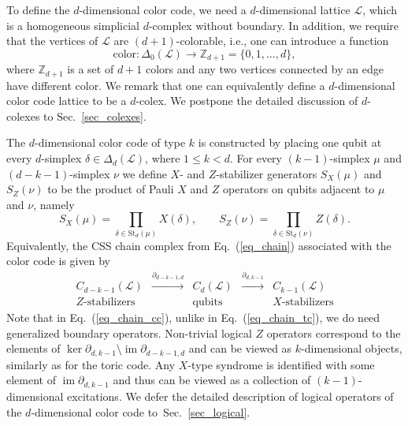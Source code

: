 \documentclass[onecolumn,letterpaper,11pt,accepted=2022-12-19]{quantumarticle}
\newcommand{\face}[2]{{\Delta_{#1}(#2)}}
\renewcommand{\star}[2]{{\mathrm{St}_{#1}(#2)}}
\DeclareMathOperator{\im}{im}
\newcommand{\bnd}[2]{\partial_{#1,#2}}
\theoremstyle{definition}
\theoremstyle{lemma}
\theoremstyle{theorem}
\theoremstyle{corollary}
\begin{document}
{To define the $d$-dimensional color code, we need a $d$-dimensional lattice $\mathcal{L}$, which is a homogeneous simplicial $d$-complex without boundary.
In addition, we require that the vertices of $\mathcal{L}$ are $(d+1)$-colorable, i.e., one can introduce a function
\begin{equation}
\textrm{color}:\face{0}{\mathcal{L}} \rightarrow \mathbb{Z}_{d+1} = \{ 0, 1, \ldots, d \},
\end{equation}
where $\mathbb{Z}_{d+1}$ is a set of $d+1$ colors and any two vertices connected by an edge have different color.
We remark that one can equivalently define a $d$-dimensional color code lattice to be a $d$-colex.
We postpone the detailed discussion of $d$-colexes to Sec.~\ref{sec_colexes}.


The $d$-dimensional color code of type $k$ is constructed by placing one qubit at every $d$-simplex $\delta\in\face d {\mathcal{L}}$, where $1\leq k<d$.
For every $(k-1)$-simplex $\mu$ and $(d-k-1)$-simplex $\nu$ we define $X$- and $Z$-stabilizer generators $S_X(\mu)$ and $S_Z(\nu)$ to be the product of Pauli $X$ and $Z$ operators on qubits adjacent to $\mu$ and $\nu$, namely
\begin{equation}
S_X(\mu) = \prod_{\delta\in\star{d}{\mu}} X(\delta),\quad\quad
S_Z(\nu) = \prod_{\delta\in\star{d}{\nu}} Z(\delta).
\end{equation}
Equivalently, the CSS chain complex from Eq.~(\ref{eq_chain}) associated with the color code is given by
\begin{equation} 
\begin{array}{ccccc}
C_{d-k-1}(\mathcal{L}) & \xrightarrow{\bnd{d-k-1}{d}} & C_d(\mathcal{L}) & \xrightarrow{\bnd{d}{k-1}} & C_{k-1}(\mathcal{L})\\
Z\textrm{-stabilizers} & & \mathrm{qubits} & & X\textrm{-stabilizers}
\end{array}
\label{eq_chain_cc}
\end{equation}
Note that in Eq.~(\ref{eq_chain_cc}), unlike in Eq.~(\ref{eq_chain_tc}), we do need generalized boundary operators.
Non-trivial logical $Z$ operators correspond to the elements of ${\ker\bnd d {k-1} \setminus \im \bnd {d-k-1} d}$ and can be viewed as $k$-dimensional objects, similarly as for the toric code.
Any $X$-type syndrome is identified with some element of $\im\bnd{d}{k-1}$ and thus can be viewed as a collection of $(k-1)$-dimensional excitations.
We defer the detailed description of logical operators of the $d$-dimensional color code to~Sec.~\ref{sec_logical}.



}
\end{document}
